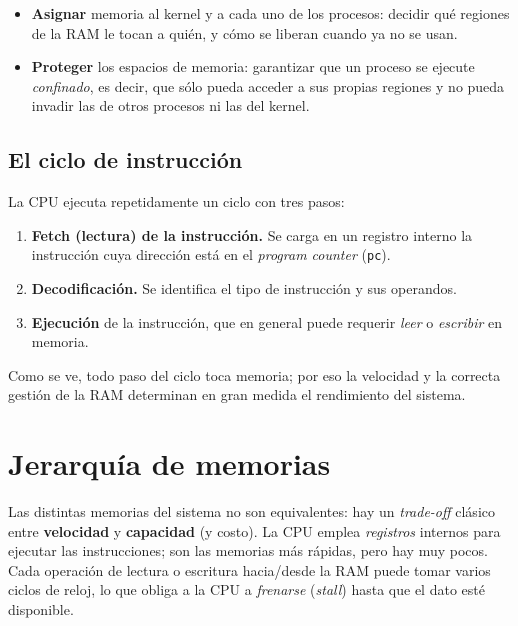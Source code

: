 \documentclass[11pt,a4paper]{article}
\begin{document}
\begin{itemize}[leftmargin=*]
    \item \textbf{Asignar} memoria al kernel y a cada uno de los
        procesos: decidir qué regiones de la RAM le tocan a quién, y
        cómo se liberan cuando ya no se usan.
    \item \textbf{Proteger} los espacios de memoria: garantizar que un
        proceso se ejecute \emph{confinado}, es decir, que sólo pueda
        acceder a sus propias regiones y no pueda invadir las de otros
        procesos ni las del kernel.
\end{itemize}

\subsection{El ciclo de instrucción}

La CPU ejecuta repetidamente un ciclo con tres pasos:

\begin{enumerate}[leftmargin=*]
    \item \textbf{Fetch (lectura) de la instrucción.} Se carga en un
        registro interno la instrucción cuya dirección está en el
        \emph{program counter} (\texttt{pc}).
    \item \textbf{Decodificación.} Se identifica el tipo de instrucción
        y sus operandos.
    \item \textbf{Ejecución} de la instrucción, que en general puede
        requerir \emph{leer} o \emph{escribir} en memoria.
\end{enumerate}

Como se ve, todo paso del ciclo toca memoria; por eso la velocidad y la
correcta gestión de la RAM determinan en gran medida el rendimiento del
sistema.

\section{Jerarquía de memorias}

Las distintas memorias del sistema no son equivalentes: hay un
\emph{trade-off} clásico entre \textbf{velocidad} y \textbf{capacidad}
(y costo). La CPU emplea \emph{registros} internos para ejecutar las
instrucciones; son las memorias más rápidas, pero hay muy pocos. Cada
operación de lectura o escritura hacia/desde la RAM puede tomar varios
ciclos de reloj, lo que obliga a la CPU a \emph{frenarse} (\emph{stall})
hasta que el dato esté disponible.
\end{document}
